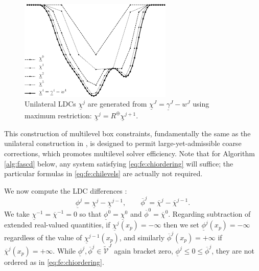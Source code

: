 \documentclass[letterpaper,final,12pt,reqno]{amsart}
\theoremstyle{cstyle}
\theoremstyle{cstyle*}
\theoremstyle{dstyle}
\numberwithin{equation}{section}
\numberwithin{figure}{section}
\numberwithin{table}{section}
\numberwithin{theorem}{section}
\newcommand{\maxR}{R^{\bm{\oplus}}}
\begin{document}
\begin{figure}[ht]
\includegraphics[width=0.65\textwidth]{fixfigs/chiphilevels.pdf}
\caption{Unilateral LDCs $\underline{\chi}^j$ are generated from $\underline{\chi}^J = \underline{\gamma}^J - w^J$ using maximum restriction: $\underline{\chi}^j = \maxR \underline{\chi}^{j+1}$.}
\label{fig:chiphilevels}
\end{figure}

This construction of multilevel box constraints, fundamentally the same as the unilateral construction in \cite{GraeserKornhuber2009}, is designed to permit large-yet-admissible coarse corrections, which promotes multilevel solver efficiency.  Note that for Algorithm \ref{alg:fascd} below, any system satisfying \eqref{eq:fe:chiordering} will suffice; the particular formulas in \eqref{eq:fe:chilevels} are actually not required.

We now compute the LDC differences \cite{GraeserKornhuber2009}:
\begin{equation}
\underline{\phi}^j = \underline{\chi}^j - \underline{\chi}^{j-1}, \qquad \overline{\phi}^j = \overline{\chi}^j - \overline{\chi}^{j-1}.  \label{eq:fe:philevels}
\end{equation}
We take $\underline{\chi}^{-1}=\overline{\chi}^{-1}=0$ so that $\underline{\phi}^0=\underline{\chi}^0$ and $\overline{\phi}^0=\overline{\chi}^0$.  Regarding subtraction of extended real-valued quantities, if $\underline{\chi}^j(x_p)=-\infty$ then we set $\underline{\phi}^j(x_p)=-\infty$ regardless of the value of $\underline{\chi}^{j-1}(x_p)$, and similarly $\overline{\phi}^j(x_p)=+\infty$ if $\overline{\chi}^j(x_p)=+\infty$.  While $\underline{\phi}^{j},\overline{\phi}^{j} \in \tilde{\mathcal{V}}^J$ again bracket zero, $\underline{\phi}^j \le 0 \le \overline{\phi}^j$, they are not ordered as in \eqref{eq:fe:chiordering}.
\end{document}
